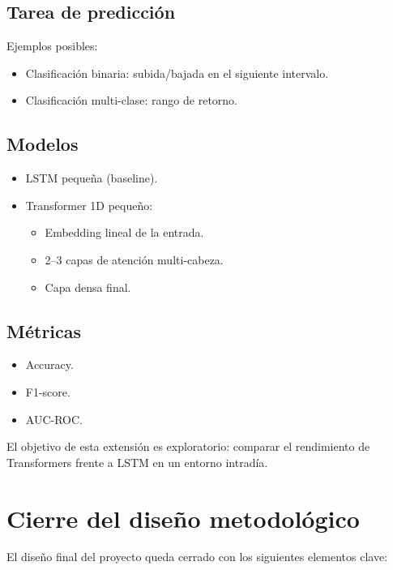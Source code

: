 \documentclass[12pt]{article}
\begin{document}
\subsection{Tarea de predicción}

Ejemplos posibles:

\begin{itemize}
    \item Clasificación binaria: subida/bajada en el siguiente intervalo.
    \item Clasificación multi-clase: rango de retorno.
\end{itemize}

\subsection{Modelos}

\begin{itemize}
    \item LSTM pequeña (baseline).
    \item Transformer 1D pequeño:
    \begin{itemize}
        \item Embedding lineal de la entrada.
        \item 2--3 capas de atención multi-cabeza.
        \item Capa densa final.
    \end{itemize}
\end{itemize}

\subsection{Métricas}

\begin{itemize}
    \item Accuracy.
    \item F1-score.
    \item AUC-ROC.
\end{itemize}

El objetivo de esta extensión es exploratorio: comparar el rendimiento de Transformers frente a LSTM en un entorno intradía.

\section{Cierre del diseño metodológico}

El diseño final del proyecto queda cerrado con los siguientes elementos clave:
\end{document}
